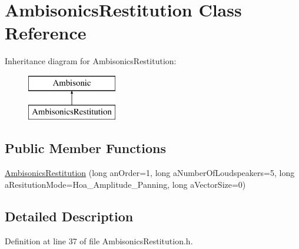 \hypertarget{class_ambisonics_restitution}{\section{Ambisonics\-Restitution Class Reference}
\label{class_ambisonics_restitution}
}
Inheritance diagram for Ambisonics\-Restitution\-:\begin{figure}[H]
\begin{center}
\leavevmode
\includegraphics[height=2.000000cm]{class_ambisonics_restitution}
\end{center}
\end{figure}
\subsection*{Public Member Functions}
\begin{DoxyCompactItemize}
\item 
\hyperlink{class_ambisonics_restitution_a287ce5a5b5d247af6c11e7bd0e50a4ab}{Ambisonics\-Restitution} (long an\-Order=1, long a\-Number\-Of\-Loudspeakers=5, long a\-Resitution\-Mode=Hoa\-\_\-\-Amplitude\-\_\-\-Panning, long a\-Vector\-Size=0)
\end{DoxyCompactItemize}


\subsection{Detailed Description}


Definition at line 37 of file Ambisonics\-Restitution.\-h.




